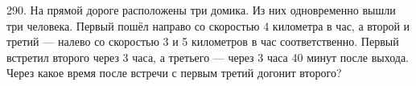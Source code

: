 290. На прямой дороге расположены три домика. Из них одновременно вышли три человека. Первый пошёл направо со скоростью 4 километра в час, а второй и третий --- налево со скоростью 3 и 5 километров в час соответственно. Первый встретил второго через 3 часа, а третьего --- через 3 часа 40 минут после выхода. Через какое время после встречи с первым третий догонит второго?\\
